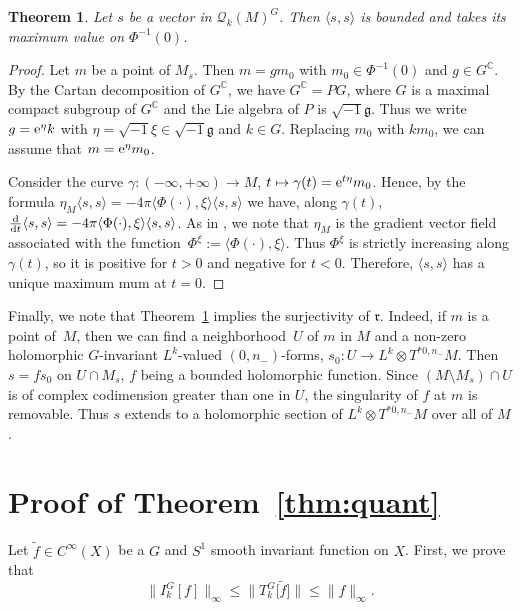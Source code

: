 \documentclass[pdftex]{sigma}
\numberwithin{equation}{section}
\newtheorem{Theorem}{Theorem}[section]
\begin{document}
	\begin{Theorem} \label{thm:final}
		Let $s$ be a vector in $\mathcal{Q}_k(M)^G$. Then $\langle s, s \rangle$ is bounded and takes its maximum value on $\Phi^{-1}(0)$.
	\end{Theorem}
	\begin{proof}
		Let $m$ be a point of $M_s$. Then $m=g m_0$ with $m_0\in \Phi^{-1}(0)$ and $g\in G^{\mathbb{C}}$. By the Cartan decomposition of $G^{\mathbb{C}}$, we have $G^{\mathbb{C}}=P G$, where $G$ is a maximal compact subgroup of $G^{\mathbb{C}}$ and the Lie algebra of $P$ is $\sqrt{-1} \mathfrak{g}$. Thus we write $g={\rm e}^{\eta} k$ with $\eta =\sqrt{-1} \xi\in \sqrt{-1} \mathfrak{g}$ and $k\in G$. Replacing $m_0$ with $k m_0$, we can assume that $m={\rm e}^{\eta} m_0$.
		
		Consider the curve $\gamma \colon (-\infty, +\infty)\rightarrow M$, $ t\mapsto \gamma(t)={\rm e}^{t \eta} m_0$. Hence, by the formula
$\eta_M\langle s, s\rangle=-4\pi \langle\Phi(\cdot), \xi\rangle \langle s, s \rangle$
		we have, along $\gamma(t)$,
$\frac{{\rm d}}{{\rm d}t}\langle s, s\rangle=-4\pi \langle\Phi(\cdot), \xi\rangle \langle s, s \rangle$.
		As in \cite[Lemma 4.7]{gs}, we note that $\eta_M$ is the gradient vector field associated with the function~${\Phi^{\xi}:=\langle\Phi(\cdot), \xi\rangle}$. Thus $\Phi^{\xi}$ is strictly increasing along $\gamma(t)$, so it is positive
		for $t>0$ and negative for $t<0$. Therefore, $\langle s, s \rangle$ has a unique maximum mum at $t=0$.
	\end{proof}
 	
 	Finally, we note that Theorem~\ref{thm:final} implies the surjectivity of $\mathfrak{r}$. Indeed,
 	if $m$ is a point of~$M$, then we can find a neighborhood~$U$ of $m$ in $M$ and a non-zero holomorphic $G$-invariant $L^k$-valued $(0, n_-)$-forms, $s_0 \colon U\rightarrow L^k\otimes T^{*0,n_-}M $. Then $s =f s_0$ on $U\cap M_s$, $f$ being a bounded holomorphic function. Since $(M\setminus M_s)\cap U$ is of complex codimension greater than one in $U$, the singularity of $f$ at $m$ is removable. Thus $s$ extends to a holomorphic section of $L^k\otimes T^{*0,n_-}M $ over all of $M$.
 	 	
\section[Proof of Theorem \ref{thm:quant}]{Proof of Theorem~\ref{thm:quant}}
	\label{sec:proofoftheorem}
	
	Let $\widetilde f\in C^{\infty}(X)$ be a $G$ and $S^1$ smooth invariant function on $X$. First, we prove that
	\begin{equation} \label{eq:ineq}
		\big\lVert I_{k}^G[f] \big\rVert_{\infty} \leq \big\rVert T^{G}_k\big[\widetilde{f}\big]\big\lVert \leq \lVert f\rVert_{\infty} .
	\end{equation}
\end{document}
